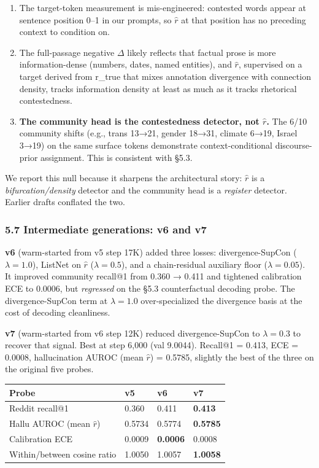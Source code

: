 \documentclass[
  11pt]{article}
\newcounter{none} %
\providecommand{\tightlist}{%
  \setlength{\itemsep}{0pt}\setlength{\parskip}{0pt}}
\begin{document}
\begin{enumerate}
\def\labelenumi{\arabic{enumi}.}
\tightlist
\item
  The target-token measurement is mis-engineered: contested words appear
  at sentence position 0--1 in our prompts, so \(\hat{r}\) at that
  position has no preceding context to condition on.
\item
  The full-passage negative \(\Delta\) likely reflects that factual
  prose is more information-dense (numbers, dates, named entities), and
  \(\hat{r}\), supervised on a target derived from r\_true that mixes
  annotation divergence with connection density, tracks information
  density at least as much as it tracks rhetorical contestedness.
\item
  \textbf{The community head is the contestedness detector, not
  \(\hat{r}\).} The 6/10 community shifts (e.g., trans 13→21, gender
  18→31, climate 6→19, Israel 3→19) on the same surface tokens
  demonstrate context-conditional discourse-prior assignment. This is
  consistent with §5.3.
\end{enumerate}

We report this null because it sharpens the architectural story:
\(\hat{r}\) is a \emph{bifurcation/density} detector and the community
head is a \emph{register} detector. Earlier drafts conflated the two.

\subsubsection{5.7 Intermediate generations: v6 and
v7}\label{intermediate-generations-v6-and-v7}

\textbf{v6} (warm-started from v5 step 17K) added three losses:
divergence-SupCon (\(\lambda = 1.0\)), ListNet on \(\hat{r}\)
(\(\lambda = 0.5\)), and a chain-residual auxiliary floor
(\(\lambda = 0.05\)). It improved community recall@1 from 0.360 → 0.411
and tightened calibration ECE to 0.0006, but \emph{regressed} on the
§5.3 counterfactual decoding probe. The divergence-SupCon term at
\(\lambda = 1.0\) over-specialized the divergence basis at the cost of
decoding cleanliness.

\textbf{v7} (warm-started from v6 step 12K) reduced divergence-SupCon to
\(\lambda = 0.3\) to recover that signal. Best at step 6,000 (val
9.0044). Recall@1 = 0.413, ECE = 0.0008, hallucination AUROC (mean
\(\hat{r}\)) = 0.5785, slightly the best of the three on the original
five probes.

{\def\LTcaptype{none} %
\begin{longtable}[]{@{}llll@{}}
\toprule\noalign{}
Probe & v5 & v6 & v7 \\
\midrule\noalign{}
\endhead
\bottomrule\noalign{}
\endlastfoot
Reddit recall@1 & 0.360 & 0.411 & \textbf{0.413} \\
Hallu AUROC (mean \(\hat{r}\)) & 0.5734 & 0.5774 & \textbf{0.5785} \\
Calibration ECE & 0.0009 & \textbf{0.0006} & 0.0008 \\
Within/between cosine ratio & 1.0050 & 1.0057 & \textbf{1.0058} \\
\end{longtable}
}
\end{document}

